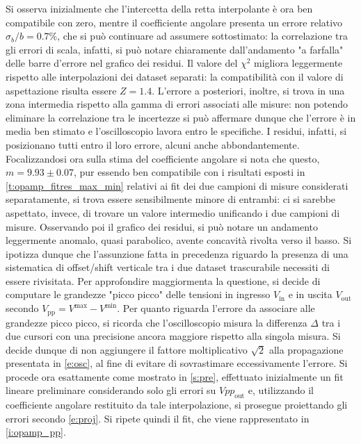 \documentclass[a4paper,11pt]{article} %
\begin{document}
\noindent Si osserva inizialmente che l'intercetta della retta interpolante è ora ben compatibile con zero, mentre il
coefficiente angolare presenta un errore relativo $\sigma_{b}/b=0.7\%$, che si può continuare ad assumere sottostimato:
la correlazione tra gli errori di scala, infatti, si può notare chiaramente dall'andamento "a farfalla" delle barre
d'errore nel grafico dei residui. Il valore del $\chi^2$ migliora leggermente rispetto alle interpolazioni dei dataset
separati: la compatibilità con il valore di aspettazione risulta essere $Z=1.4$. L'errore a posteriori, inoltre, si
trova in una zona intermedia rispetto alla gamma di errori associati alle misure: non potendo eliminare la correlazione
tra le incertezze si può affermare dunque che l'errore è in media ben stimato e l'oscilloscopio lavora entro le
specifiche. I residui, infatti, si posizionano tutti entro il loro errore, alcuni anche abbondantemente. Focalizzandosi
ora sulla stima del coefficiente angolare si nota che questo, $m=9.93\pm 0.07$, pur essendo ben compatibile con i
risultati esposti in  \autoref{t:opamp_fitres_max_min} relativi ai fit dei due campioni di misure considerati
separatamente, si trova essere sensibilmente minore di entrambi: ci si sarebbe aspettato, invece, di trovare un valore
intermedio unificando i due campioni di misure. Osservando poi il grafico dei residui, si può notare un andamento
leggermente anomalo, quasi parabolico, avente concavità rivolta verso il basso. Si ipotizza dunque che l'assunzione
fatta in precedenza riguardo la presenza di una sistematica di offset/shift verticale tra i due dataset trascurabile
necessiti di essere rivisitata. Per approfondire maggiormenta la questione, si decide di computare le grandezze "picco
picco" delle tensioni in ingresso $V_{\text{in}}$ e in uscita $V_{\text{out}}$ secondo
$V_{\text{pp}}=V^{\text{max}}-V^{\text{min}}$. Per quanto riguarda l'errore da associare alle grandezze picco picco, si
ricorda che l'oscilloscopio misura la differenza $\Delta$ tra i due cursori con una precisione ancora maggiore rispetto
alla singola misura. Si decide dunque di non aggiungere il fattore moltiplicativo $\sqrt{2}$ alla propagazione
presentata in  \autoref{e:osc}, al fine di evitare di sovrastimare eccessivamente l'errore. Si procede ora esattamente
come mostrato in  \autoref{s:pre}, effettuato inizialmente un fit lineare preliminare considerando solo gli errori su
$Vpp_{\text{out}}$ e, utilizzando il coefficiente angolare restituito da tale interpolazione, si prosegue proiettando
gli errori secondo  \autoref{e:proj}. Si ripete quindi il fit, che viene rappresentato in \autoref{i:opamp_pp}.
\end{document}

